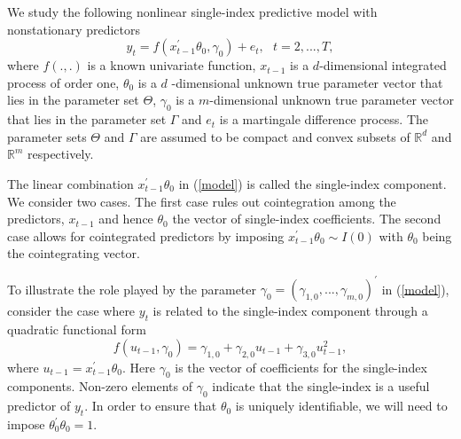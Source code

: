 \documentclass[12pt,a4paper]{article}
\begin{document}
We study the following nonlinear single-index predictive model with nonstationary predictors%
\begin{equation}
y_{t}=f\left( x_{t-1}^{\prime }\theta _{0},\gamma _{0}\right) +e_{t},\ \ \
t=2,...,T,  \label{model}
\end{equation}%
where $f\left( .,.\right) $ is a known univariate function, $x_{t-1}$ is a $d
$-dimensional integrated process of order one, $\theta _{0}$ is a $d$%
-dimensional unknown true parameter vector that lies in the parameter set $%
\Theta $, $\gamma _{0}$ is a $m$-dimensional unknown true parameter vector
that lies in the parameter set $\Gamma $ and $e_{t}$ is a martingale
difference process. The parameter sets $\Theta $ and $\Gamma $ are assumed
to be compact and convex subsets of $\mathbb{R}^{d}$ and $\mathbb{R}^{m}$
respectively.

The linear combination $x_{t-1}^{\prime }\theta _{0}$ in (\ref{model}) is
called the single-index component. We consider two cases. The first case
rules out cointegration among the predictors, $x_{t-1}$ and hence $\theta_{0}$ the vector of
single-index coefficients. The second case allows for
cointegrated predictors by imposing $x_{t-1}^{\prime }\theta _{0}\sim
I\left( 0\right) $ with $\theta _{0}$ being the cointegrating vector.

To illustrate the role played by the parameter $\gamma _{0}=\left( \gamma
_{1,0},...,\gamma _{m,0}\right) ^{\prime }$ in (\ref{model}), consider the
case where $y_{t}$ is related to the single-index component through a
quadratic functional form%
\[
f\left( u_{t-1},\gamma _{0}\right) =\gamma _{1,0}+\gamma
_{2,0}u_{t-1}+\gamma _{3,0}u_{t-1}^{2},
\]%
where $u_{t-1}=x_{t-1}^{\prime }\theta _{0}.$ Here $\gamma _{0}$ is the
vector of coefficients for the single-index components. Non-zero elements of 
$\gamma _{0}$ indicate that the single-index is a useful predictor of $y_{t}$.
In order to ensure that $\theta_0$ is uniquely identifiable, we will need to impose $\theta_{0}^{\prime}\theta_{0} = 1$.
\end{document}
